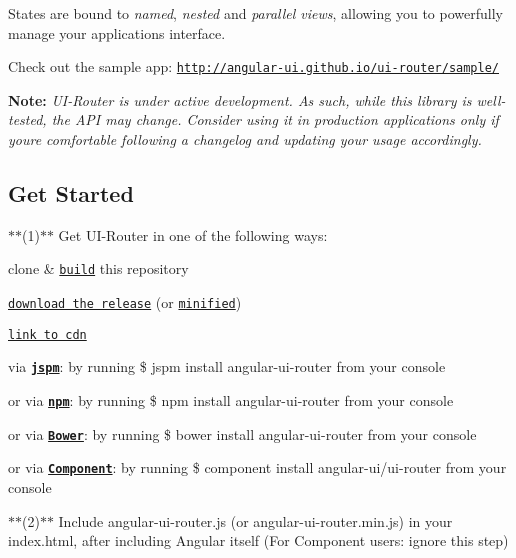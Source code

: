 States are bound to {\itshape named}, {\itshape nested} and {\itshape parallel views}, allowing you to powerfully manage your application\textquotesingle{}s interface.

Check out the sample app\+: \href{http://angular-ui.github.io/ui-router/sample/}{\tt http\+://angular-\/ui.\+github.\+io/ui-\/router/sample/}


\begin{DoxyItemize}
\item {\bfseries Note\+:} {\itshape U\+I-\/\+Router is under active development. As such, while this library is well-\/tested, the A\+PI may change. Consider using it in production applications only if you\textquotesingle{}re comfortable following a changelog and updating your usage accordingly.}
\end{DoxyItemize}

\subsection*{Get Started}

$\ast$$\ast$(1)$\ast$$\ast$ Get U\+I-\/\+Router in one of the following ways\+:
\begin{DoxyItemize}
\item clone \& \href{CONTRIBUTING.md#developing}{\tt build} this repository
\item \href{http://angular-ui.github.io/ui-router/release/angular-ui-router.js}{\tt download the release} (or \href{http://angular-ui.github.io/ui-router/release/angular-ui-router.min.js}{\tt minified})
\item \href{http://cdnjs.com/libraries/angular-ui-router}{\tt link to cdn}
\item via {\bfseries \href{http://jspm.io/}{\tt jspm}}\+: by running {\ttfamily \$ jspm install angular-\/ui-\/router} from your console
\item or via {\bfseries \href{https://www.npmjs.org/}{\tt npm}}\+: by running {\ttfamily \$ npm install angular-\/ui-\/router} from your console
\item or via {\bfseries \href{http://bower.io/}{\tt Bower}}\+: by running {\ttfamily \$ bower install angular-\/ui-\/router} from your console
\item or via {\bfseries \href{https://github.com/component/component}{\tt Component}}\+: by running {\ttfamily \$ component install angular-\/ui/ui-\/router} from your console
\end{DoxyItemize}

$\ast$$\ast$(2)$\ast$$\ast$ Include {\ttfamily angular-\/ui-\/router.\+js} (or {\ttfamily angular-\/ui-\/router.\+min.\+js}) in your {\ttfamily index.\+html}, after including Angular itself (For Component users\+: ignore this step)

